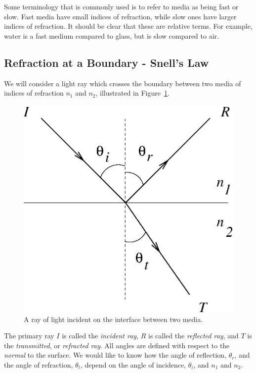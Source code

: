 Some terminology that is commonly used is to refer to media as being fast or
slow.  Fast media have small indices of refraction, while slow ones have
larger indices of refraction.  It should be clear that these are relative 
terms. For example, water is a fast medium compared to 
glass, but is slow compared to air. 


\subsection{Refraction at a Boundary - Snell's Law}

We will consider a light ray which crosses the boundary between two media of 
indices of refraction $n_1$ and $n_2$, illustrated in 
Figure~\ref{fig:opt:interface}.
\begin{figure}[htb]
\centering 
\epsfxsize=6cm \includegraphics[scale=0.6]{8_refraction/interface.eps}
\caption{A ray of light incident on the interface between two media.}
\label{fig:opt:interface}
\end{figure}
The primary ray $I$ is called the {\it incident ray}, $R$ is called the 
{\it reflected ray}, and $T$ is the {\it transmitted}, or {\it refracted ray}.
All angles are defined with respect to the {\it normal} to the surface. We 
would like to know how the angle of reflection, $\theta_r$, and the angle
of refraction, $\theta_t$, depend on the angle of incidence, $\theta_i$, and
$n_1$ and $n_2$.

